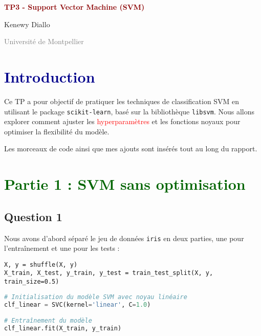 \documentclass[10pt,a4paper]{article}
\begin{document}
\begin{titlepage}
    \centering
    \vspace*{5cm}
    {\Huge\textbf{\textcolor{DarkRed}{TP3 - Support Vector Machine (SVM)}}\par}
    \vspace{1cm}
    {\Large Kenewy Diallo\par}
    \vfill
    \textcolor{Gray}{Université de Montpellier\par}
    \vspace{0.8cm}
    \vspace*{3cm}
\end{titlepage}

\section*{\textcolor{DarkBlue}{Introduction}}
Ce TP a pour objectif de pratiquer les techniques de classification SVM en utilisant le package \texttt{scikit-learn}, basé sur la bibliothèque \texttt{libsvm}. Nous allons explorer comment ajuster les \textcolor{Red}{hyperparamètres} et les fonctions noyaux pour optimiser la flexibilité du modèle.

\medskip

 Les morceaux de code ainsi que mes ajouts sont insérés tout au long du rapport.




\section*{\textcolor{DarkGreen}{Partie 1 : SVM sans optimisation}}
\subsection*{Question 1 }
Nous avons d'abord séparé le jeu de données \texttt{iris} en deux parties, une pour l'entraînement et une pour les tests :

\begin{lstlisting}
X, y = shuffle(X, y)
X_train, X_test, y_train, y_test = train_test_split(X, y, train_size=0.5)
\end{lstlisting}



\begin{lstlisting}[language=Python, caption=Initialisation et entraînement du modèle SVM avec noyau linéaire]
# Initialisation du modèle SVM avec noyau linéaire
clf_linear = SVC(kernel='linear', C=1.0)

# Entraînement du modèle
clf_linear.fit(X_train, y_train)
\end{lstlisting}
\end{document}
